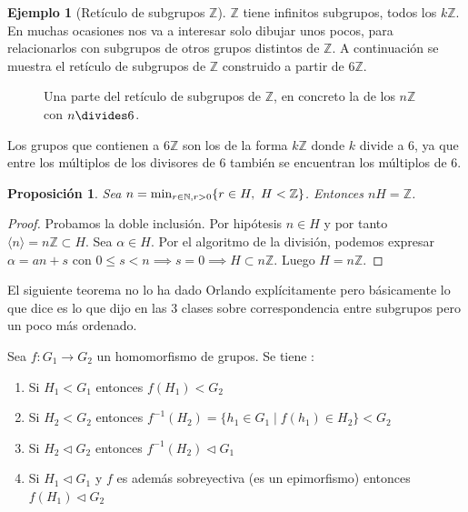 \documentclass{book}
\newtheorem{pro}{Proposición}
\theoremstyle{definition}
\newtheorem{ej}{Ejemplo}
\theoremstyle{remark}
\newcommand{\normsub}{\mathbin{\triangleleft}}
\newcommand{\N}{\mathbb{N}}
\newcommand{\Z}{\mathbb{Z}}
\begin{document}
\begin{ej}[Retículo de subgrupos $\Z$]
	$\Z$ tiene infinitos subgrupos, todos los $k\Z$. En muchas ocasiones nos va a interesar solo dibujar unos pocos, para relacionarlos con subgrupos de otros grupos distintos de $\Z$. A continuación se muestra el retículo de subgrupos de $\Z$ construido a partir de $6\Z$.
	
	\begin{figure}[h]
		\centering
		\caption{Una parte del retículo de subgrupos de $\Z$, en concreto la de los $n\Z$ con $n \divides 6$.}
	\end{figure}

	Los grupos que contienen a $6\Z$ son los de la forma $k\Z$ donde $k$ divide a $6$, ya que entre los múltiplos de los divisores de $6$ también se encuentran los múltiplos de $6$.
\end{ej}

\begin{pro}
	Sea $n = \min_{r \in \N,\\r > 0} \{ r \in H,\ H < \Z\}$. Entonces $nH = \Z$.
\end{pro}
\begin{proof}
	Probamos la doble inclusión. Por hipótesis $n \in H$ y por tanto $\langle n \rangle = n\Z \subset H$. Sea $\alpha \in H$. Por el algoritmo de la división, podemos expresar $\alpha = an + s$ con $0 \leq s < n \implies s = 0 \implies H \subset n\Z$. Luego $H = n\Z$.
\end{proof}

El siguiente teorema no lo ha dado Orlando explícitamente pero básicamente lo que dice es lo que dijo en las 3 clases sobre correspondencia entre subgrupos pero un poco más ordenado.

\begin{thm}
	Sea $f:G_1 \to G_2$ un homomorfismo de grupos. Se tiene \cite{dor96}:
	\begin{enumerate}
		\item Si $H_1 < G_1$ entonces $f(H_1) < G_2$
		\item Si $H_2 < G_2$ entonces $f^{-1}(H_2) = \{h_1 \in G_1 \mid f(h_1) \in H_2\} < G_2$
		\item Si $H_2 \normsub G_2$ entonces $f^{-1}(H_2) \normsub G_1$
		\item Si $H_1 \normsub G_1$ y $f$ es además sobreyectiva (es un epimorfismo) entonces $f(H_1) \normsub G_2$
	\end{enumerate}
\end{thm}
\end{document}
